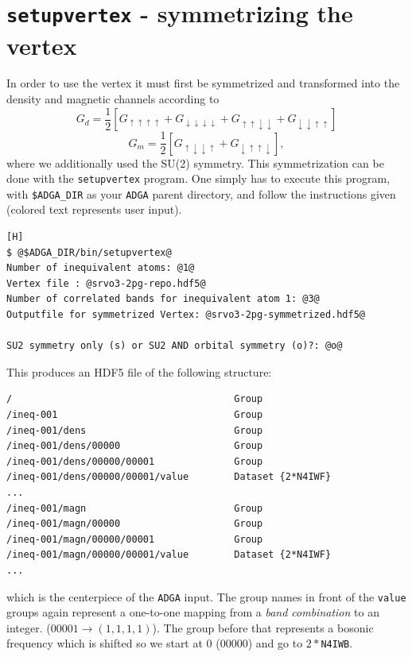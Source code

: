 \documentclass[a4paper,11pt]{article}
\numberwithin{equation}{section} %
\begin{document}
\newpage
\section{\protect\Verb+setupvertex+ - symmetrizing the vertex}
In order to use the vertex it must first be symmetrized and transformed into the density and magnetic channels according to
\begin{equation*}
G_d = \frac{1}{2}\left[G_{\uparrow\uparrow\uparrow\uparrow} + G_{\downarrow\downarrow\downarrow\downarrow} + G_{\uparrow\uparrow\downarrow\downarrow} + G_{\downarrow\downarrow\uparrow\uparrow} \right]
\end{equation*}
\begin{equation*}
G_m = \frac{1}{2}\left[G_{\uparrow\downarrow\downarrow\uparrow} + G_{\downarrow\uparrow\uparrow\downarrow} \right],
\end{equation*}
where we additionally used the SU(2) symmetry.
%
This symmetrization can be done with the \verb|setupvertex| program. One simply has to execute this program, with \verb+$ADGA_DIR+ as your \verb+ADGA+ parent directory, and follow the instructions given (colored text represents user input).
\begin{lstlisting}[caption=exemplary setupvertex execution, frame=single, basicstyle=\small, style=base][H]
$ @$ADGA_DIR/bin/setupvertex@
Number of inequivalent atoms: @1@
Vertex file : @srvo3-2pg-repo.hdf5@
Number of correlated bands for inequivalent atom 1: @3@
Outputfile for symmetrized Vertex: @srvo3-2pg-symmetrized.hdf5@

SU2 symmetry only (s) or SU2 AND orbital symmetry (o)?: @o@
\end{lstlisting}
This produces an HDF5 file of the following structure:
\begin{lstlisting}[caption=symmetrized vertex structure, frame=single, basicstyle=\small]
/                                       Group
/ineq-001                               Group
/ineq-001/dens                          Group
/ineq-001/dens/00000                    Group
/ineq-001/dens/00000/00001              Group
/ineq-001/dens/00000/00001/value        Dataset {2*N4IWF}
...
/ineq-001/magn                          Group
/ineq-001/magn/00000                    Group
/ineq-001/magn/00000/00001              Group
/ineq-001/magn/00000/00001/value        Dataset {2*N4IWF}
...
\end{lstlisting}

which is the centerpiece of the \verb+ADGA+ input. The group names in front of the \verb|value| groups again represent a one-to-one mapping from a  \emph{band combination} to an integer. ($00001 \rightarrow (1,1,1,1)$). The group before that represents a bosonic frequency which is shifted so we start at 0 (00000) and go to $2\ast$\verb|N4IWB|.
\end{document}
